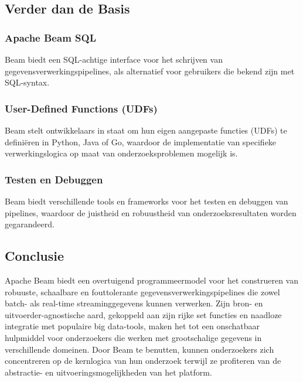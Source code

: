 \subsection{Verder dan de Basis}

\subsubsection{Apache Beam SQL}
Beam biedt een SQL-achtige interface voor het schrijven van gegevensverwerkingspipelines, als alternatief voor gebruikers die bekend zijn met SQL-syntax.

\subsubsection{User-Defined Functions (UDFs)}
Beam stelt ontwikkelaars in staat om hun eigen aangepaste functies (UDFs) te definiëren in Python, Java of Go, waardoor de implementatie van specifieke verwerkingslogica op maat van onderzoeksproblemen mogelijk is.

\subsubsection{Testen en Debuggen}
Beam biedt verschillende tools en frameworks voor het testen en debuggen van pipelines, waardoor de juistheid en robuustheid van onderzoeksresultaten worden gegarandeerd.

\subsection{Conclusie}

Apache Beam biedt een overtuigend programmeermodel voor het construeren van robuuste, schaalbare en fouttolerante gegevensverwerkingspipelines die zowel batch- als real-time streaminggegevens kunnen verwerken. Zijn bron- en uitvoerder-agnostische aard, gekoppeld aan zijn rijke set functies en naadloze integratie met populaire big data-tools, maken het tot een onschatbaar hulpmiddel voor onderzoekers die werken met grootschalige gegevens in verschillende domeinen. Door Beam te benutten, kunnen onderzoekers zich concentreren op de kernlogica van hun onderzoek terwijl ze profiteren van de abstractie- en uitvoeringsmogelijkheden van het platform.

